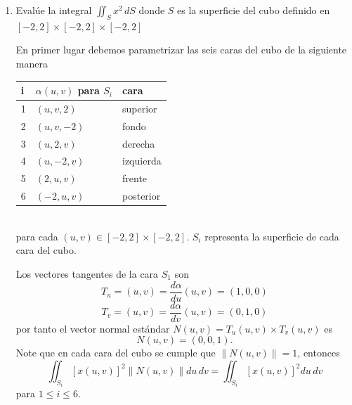 \documentclass[a4,11pt]{aleph-examen}
\begin{document}
\begin{preguntas}
\begin{respuesta}
\begin{respuesta}
\begin{respuesta}
\begin{enumerate}
\item
    Evalúe la integral $\iint_S x^2\,dS$ donde $S$ es la superficie del cubo definido en $[-2,2]\times [-2,2]\times[-2,2]$

\begin{respuesta} 
    En primer lugar debemos parametrizar las seis caras del cubo de la siguiente manera
    \begin{table}[htbp]
    \begin{center}
    \begin{tabular}{l|l|l}
    i & $\alpha (u,v)$ para $S_i$ & cara \\
    \hline 
    1 & $(u,v,2)$ & superior\\ \hline
    2 & $(u,v,-2)$ & fondo \\ \hline
    3 & $(u,2,v)$ & derecha \\ \hline
    4 & $(u,-2,v)$ & izquierda \\ \hline
    5 & $(2,u,v)$ & frente \\ \hline
    6 & $(-2,u,v)$ & posterior \\
    \end{tabular}
    \end{center}
    \end{table}
    \\para cada $(u,v)\in[-2,2]\times[-2,2]$. $S_i$ representa la superficie de cada cara del cubo.
    
   Los vectores tangentes de la cara $S_1$ son
    \[
        T_u=(u,v)=\frac{d\alpha}{du}(u,v)=(1,0,0)
    \]
    \[
        T_v=(u,v)=\frac{d\alpha}{dv}(u,v)=(0,1,0)
    \]
    por tanto el vector normal estándar $N(u,v)=T_u(u,v)\times T_v(u,v)$ es
    \[
        N(u,v)=(0,0,1).
    \]
    Note que en cada cara del cubo se cumple que $\|N(u,v)\|=1$, entonces
    \[
        \iint_{S_i}[x(u,v)]^2\|N(u,v)\|du\,dv=\iint_{S_i}[x(u,v)]^2du\,dv
    \]
    para $1\leq i \leq 6$.
        

\end{respuesta}
\end{enumerate}
\end{respuesta}
\end{respuesta}
\end{respuesta}
\end{preguntas}
\end{document}

